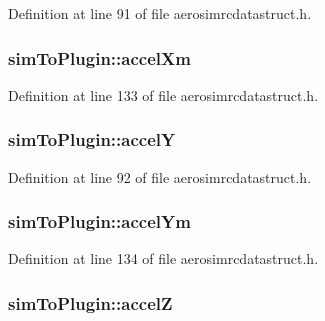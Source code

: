 Definition at line 91 of file aerosimrcdatastruct.\-h.

\hypertarget{group___aero_sim_r_c_ga8e87f9c4846725309216b66cf48a4fdd}{
\subsubsection[{accel\-Xm}]{ sim\-To\-Plugin\-::accel\-Xm}}\label{group___aero_sim_r_c_ga8e87f9c4846725309216b66cf48a4fdd}


Definition at line 133 of file aerosimrcdatastruct.\-h.

\hypertarget{group___aero_sim_r_c_gacbcac5da9b87bf7eb091f7a83b3d2fda}{
\subsubsection[{accel\-Y}]{ sim\-To\-Plugin\-::accel\-Y}}\label{group___aero_sim_r_c_gacbcac5da9b87bf7eb091f7a83b3d2fda}


Definition at line 92 of file aerosimrcdatastruct.\-h.

\hypertarget{group___aero_sim_r_c_gafb442cc82353fedd9b1a4b1f841a780a}{
\subsubsection[{accel\-Ym}]{ sim\-To\-Plugin\-::accel\-Ym}}\label{group___aero_sim_r_c_gafb442cc82353fedd9b1a4b1f841a780a}


Definition at line 134 of file aerosimrcdatastruct.\-h.

\hypertarget{group___aero_sim_r_c_ga757616fff3384f894b594e9681d39f90}{
\subsubsection[{accel\-Z}]{ sim\-To\-Plugin\-::accel\-Z}}\label{group___aero_sim_r_c_ga757616fff3384f894b594e9681d39f90}


